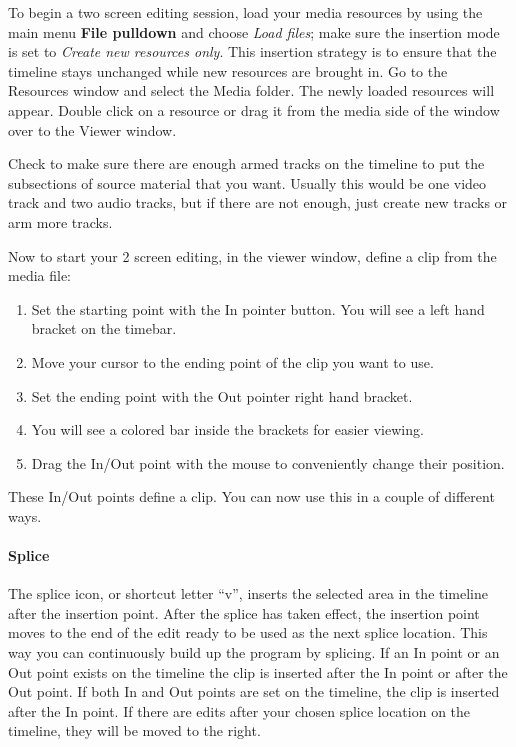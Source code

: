 To begin a two screen editing session, load your media resources by using the main menu \textbf{File pulldown} and choose \textit{Load files}; make sure the insertion mode is set to \textit{Create new resources only}.  This insertion strategy is to ensure that the timeline stays unchanged while new resources are brought in. Go to the Resources window and select the Media folder. The newly loaded resources will appear. Double click on a resource or drag it from the media side of the window over to the Viewer window.

Check to make sure there are enough armed tracks on the timeline to put the subsections of source material that you want.  Usually this would be one video track and two audio tracks, but if there are not enough, just create new tracks or arm more tracks.

Now to start your 2 screen editing, in the viewer window, define a clip from the media file:

\begin{enumerate}
    \item Set the starting point with the In pointer button.  You will see a left hand bracket on the timebar.
    \item Move your cursor to the ending point of the clip you want to use.
    \item Set the ending point with the Out pointer right hand bracket.
    \item You will see a colored bar inside the brackets for easier viewing.
    \item Drag the In/Out point with the mouse to conveniently change their position.
\end{enumerate}

\noindent These In/Out points define a clip.  You can now use this in a couple of different ways.

\paragraph{Splice} The splice icon, or shortcut letter “v”, inserts the selected area in the timeline after the insertion point.  After the splice has taken effect, the insertion point moves to the end of the edit ready to be used as the next splice location. This way you can continuously build up the program by splicing.
If an In point or an Out point exists on the timeline the clip is inserted after the In point or after the Out point. If both In and Out points are set on the timeline, the clip is inserted after the In point. If there are edits after your chosen splice location on the timeline, they will be moved to the right.

